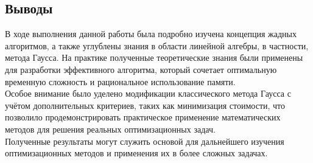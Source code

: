 \documentclass[12pt]{article}
\begin{document}
\subsection*{Выводы}

В ходе выполнения данной работы была подробно изучена концепция жадных алгоритмов, а также углублены знания в области линейной алгебры, в частности, метода Гаусса. На практике полученные теоретические знания были применены для разработки эффективного алгоритма, который сочетает оптимальную временную сложность и рациональное использование памяти.\\
Особое внимание было уделено модификации классического метода Гаусса с учётом дополнительных критериев, таких как минимизация стоимости, что позволило продемонстрировать практическое применение математических методов для решения реальных оптимизационных задач. \\
Полученные результаты могут служить основой для дальнейшего изучения оптимизационных методов и применения их в более сложных задачах.
\end{document}
